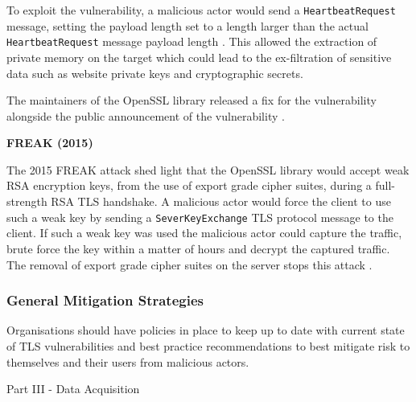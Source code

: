 \documentclass{mscreport}
\begin{document}
\vspace{0.2cm} \noindent
To exploit the vulnerability, a malicious actor would send a \texttt{HeartbeatRequest} message, setting the payload length set to a length larger than the actual \texttt{HeartbeatRequest} message payload length \cite{Durumeric2014-yj}. This allowed the extraction of private memory on the target which could lead to the ex-filtration of sensitive data such as website private keys and cryptographic secrets.

\vspace{0.3cm} \noindent
The maintainers of the OpenSSL library released a fix for the vulnerability alongside the public announcement of the vulnerability \cite{Durumeric2014-yj}.


\vspace{0.6cm} \noindent
\textbf{FREAK (2015)}

\vspace{0.2cm} \noindent
The 2015 FREAK attack shed light that the OpenSSL library would accept weak RSA encryption keys, from the use of export grade cipher suites, during a full-strength RSA TLS handshake. A malicious actor would force the client to use such a weak key by sending a \texttt{SeverKeyExchange} TLS protocol message to the client. If such a weak key was used the malicious actor could capture the traffic, brute force the key within a matter of hours and decrypt the captured traffic. The removal of export grade cipher suites on the server stops this attack \cite{Ristic2017-aj,Beurdouche2015-ga}.

\subsubsection{General Mitigation Strategies}

Organisations should have policies in place to keep up to date with current state of TLS vulnerabilities and best practice recommendations to best mitigate risk to themselves and their users from malicious actors.

\newpage

\vspace*{\fill}
\begin{center}
\begin{huge}
Part III - Data Acquisition 
\end{huge}
\end{center}
\vspace{\fill}

\clearpage
\newpage
\end{document}
